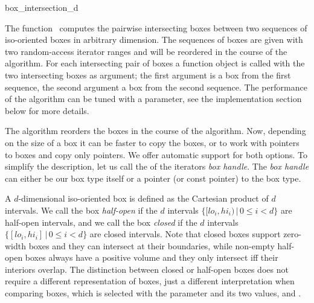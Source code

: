 

\begin{ccRefFunction}{box_intersection_d}

\ccDefinition

The function \ccRefName\ computes the pairwise intersecting boxes
between two sequences of iso-oriented boxes in arbitrary dimension.
The sequences of boxes are given with two random-access iterator
ranges and will be reordered in the course of the algorithm. For each
intersecting pair of boxes a  function object is called
with the two intersecting boxes as argument; the first argument is a
box from the first sequence, the second argument a box from the second
sequence.  The performance of the algorithm can be tuned with a
 parameter, see the implementation section below for more
details.

The algorithm reorders the boxes in the course of the algorithm. Now,
depending on the size of a box it can be faster to copy the boxes, or
to work with pointers to boxes and copy only pointers. We offer
automatic support for both options. To simplify the description, let
us call the  of the iterators \emph{box handle}.  The
\emph{box handle\/} can either be our box type itself or a pointer (or
const pointer) to the box type.

A $d$-dimensional iso-oriented box is defined as the
Cartesian product of $d$ intervals. We call the
box \emph{half-open} if the $d$ intervals $\{ [lo_i,hi_i) \,|\, 0 \leq
i < d\}$ are half-open intervals, and we call the box \emph{closed} if
the $d$ intervals $\{ [lo_i,hi_i] \,|\, 0 \leq i < d\}$ are closed
intervals. Note that closed boxes support zero-width boxes and they
can intersect at their boundaries, while non-empty half-open boxes
always have a positive volume and they only intersect iff their
interiors overlap.  The distinction between closed or half-open boxes
does not require a different representation of boxes, just a different
interpretation when comparing boxes, which is selected with the
 parameter and its two values,
 and
.


\end{ccRefFunction}
